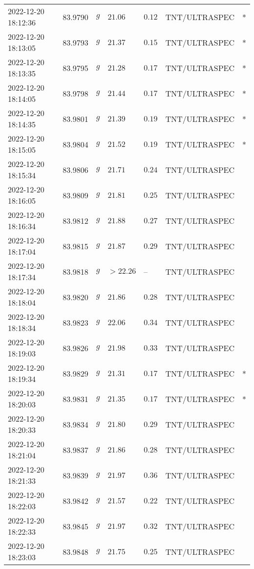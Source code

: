\documentclass{nature_plusfigure}
\begin{document}
\begin{supplement}
\begin{center}
\begin{longtable}{lllllll}
2022-12-20 18:12:36 & 83.9790 & $g$ & $21.06$ & $0.12$ & TNT/ULTRASPEC & * \\ 
2022-12-20 18:13:05 & 83.9793 & $g$ & $21.37$ & $0.15$ & TNT/ULTRASPEC & * \\ 
2022-12-20 18:13:35 & 83.9795 & $g$ & $21.28$ & $0.17$ & TNT/ULTRASPEC & * \\ 
2022-12-20 18:14:05 & 83.9798 & $g$ & $21.44$ & $0.17$ & TNT/ULTRASPEC & * \\ 
2022-12-20 18:14:35 & 83.9801 & $g$ & $21.39$ & $0.19$ & TNT/ULTRASPEC & * \\ 
2022-12-20 18:15:05 & 83.9804 & $g$ & $21.52$ & $0.19$ & TNT/ULTRASPEC & * \\ 
2022-12-20 18:15:34 & 83.9806 & $g$ & $21.71$ & $0.24$ & TNT/ULTRASPEC &  \\ 
2022-12-20 18:16:05 & 83.9809 & $g$ & $21.81$ & $0.25$ & TNT/ULTRASPEC &  \\ 
2022-12-20 18:16:34 & 83.9812 & $g$ & $21.88$ & $0.27$ & TNT/ULTRASPEC &  \\ 
2022-12-20 18:17:04 & 83.9815 & $g$ & $21.87$ & $0.29$ & TNT/ULTRASPEC &  \\ 
2022-12-20 18:17:34 & 83.9818 & $g$ & $>22.26$ & -- & TNT/ULTRASPEC &  \\ 
2022-12-20 18:18:04 & 83.9820 & $g$ & $21.86$ & $0.28$ & TNT/ULTRASPEC &  \\ 
2022-12-20 18:18:34 & 83.9823 & $g$ & $22.06$ & $0.34$ & TNT/ULTRASPEC &  \\ 
2022-12-20 18:19:03 & 83.9826 & $g$ & $21.98$ & $0.33$ & TNT/ULTRASPEC &  \\ 
2022-12-20 18:19:34 & 83.9829 & $g$ & $21.31$ & $0.17$ & TNT/ULTRASPEC & * \\ 
2022-12-20 18:20:03 & 83.9831 & $g$ & $21.35$ & $0.17$ & TNT/ULTRASPEC & * \\ 
2022-12-20 18:20:33 & 83.9834 & $g$ & $21.80$ & $0.29$ & TNT/ULTRASPEC &  \\ 
2022-12-20 18:21:04 & 83.9837 & $g$ & $21.86$ & $0.28$ & TNT/ULTRASPEC &  \\ 
2022-12-20 18:21:33 & 83.9839 & $g$ & $21.97$ & $0.36$ & TNT/ULTRASPEC &  \\ 
2022-12-20 18:22:03 & 83.9842 & $g$ & $21.57$ & $0.22$ & TNT/ULTRASPEC &  \\ 
2022-12-20 18:22:33 & 83.9845 & $g$ & $21.97$ & $0.32$ & TNT/ULTRASPEC &  \\ 
2022-12-20 18:23:03 & 83.9848 & $g$ & $21.75$ & $0.25$ & TNT/ULTRASPEC &  \\ 

\end{longtable}
\end{center}
\end{supplement}
\end{document}
